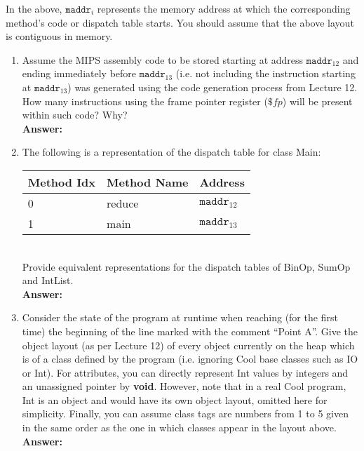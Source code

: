 \documentclass[11pt]{article}
\begin{document}
\begin{enumerate}
  In the above, $\mathtt{maddr}_i$ represents the memory address at which the corresponding method's code or dispatch table starts. You should assume that the above layout is contiguous in memory.
  
  \newpage
  
  \begin{enumerate}
    \item  Assume the MIPS assembly code to be stored starting at address $\mathtt{maddr}_{12}$ and ending immediately before $\mathtt{maddr}_{13}$ (i.e. not including the instruction starting at $\mathtt{maddr}_{13}$) was generated using the code generation process from Lecture 12. How many instructions using the frame pointer register ($\$fp$) will be present within such code? Why?\\
    \textbf{Answer:} 
    
   \newpage
    \item The following is a representation of the dispatch table for class Main: \\
    
    \begin{tabular}{ | l | l | l | }
    \hline
    Method Idx & Method Name & Address \\
    \hline
    0 & reduce & $\mathtt{maddr}_{12}$ \\
    \hline
    1 & main & $\mathtt{maddr}_{13}$ \\
    \hline
    \end{tabular} \\
    
    Provide equivalent representations for the dispatch tables of BinOp, SumOp and IntList.\\
    \textbf{Answer:} 
    
   \newpage
    \item  Consider the state of the program at runtime when reaching (for the first time) the beginning of the line marked with the comment ``Point A''. Give the object layout (as per Lecture 12) of every object currently on the heap which is of a class defined by the program (i.e. ignoring Cool base classes such as IO or Int). For attributes, you can directly represent Int values by integers and an unassigned pointer by \textbf{void}. However, note that in a real Cool program, Int is an object and would have its own object layout, omitted here for simplicity. Finally, you can assume class tags are numbers from 1 to 5 given in the same order as the one in which classes appear in the layout above.\\
    \textbf{Answer:} 
    

\end{enumerate}
\end{enumerate}
\end{document}
